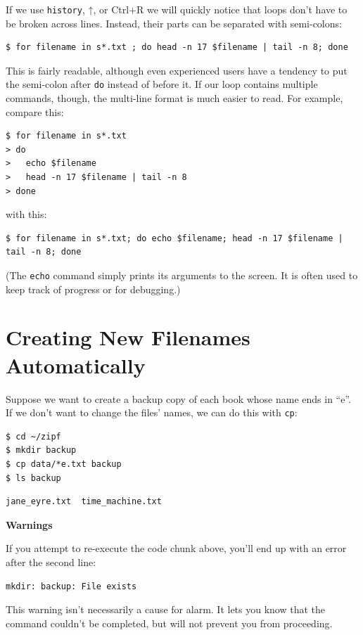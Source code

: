 \documentclass[
]{krantz}
\renewenvironment{quote}{\begin{VF}}{\end{VF}}
\begin{document}
If we use \texttt{history}, ↑, or Ctrl+R
we will quickly notice that loops don't have to be broken across lines.
Instead,
their parts can be separated with semi-colons:

\begin{verbatim}
$ for filename in s*.txt ; do head -n 17 $filename | tail -n 8; done
\end{verbatim}

This is fairly readable,
although even experienced users have a tendency to put the semi-colon after \texttt{do} instead of before it.
If our loop contains multiple commands,
though,
the multi-line format is much easier to read.
For example,
compare this:

\begin{verbatim}
$ for filename in s*.txt
> do
>   echo $filename
>   head -n 17 $filename | tail -n 8
> done
\end{verbatim}

with this:

\begin{verbatim}
$ for filename in s*.txt; do echo $filename; head -n 17 $filename | tail -n 8; done
\end{verbatim}

(The \texttt{echo} command simply prints its arguments to the screen.
It is often used to keep track of progress or for debugging.)

\hypertarget{bash-basics-autoname}{%
\section{Creating New Filenames Automatically}\label{bash-basics-autoname}}

Suppose we want to create a backup copy of each book whose name ends in ``e''.
If we don't want to change the files' names,
we can do this with \texttt{cp}:

\begin{verbatim}
$ cd ~/zipf
$ mkdir backup
$ cp data/*e.txt backup
$ ls backup
\end{verbatim}

\begin{verbatim}
jane_eyre.txt  time_machine.txt
\end{verbatim}

\begin{quote}
\textbf{Warnings}

If you attempt to re-execute the code chunk above,
you'll end up with an error after the second line:

\begin{verbatim}
mkdir: backup: File exists
\end{verbatim}

This warning isn't necessarily a cause for alarm.
It lets you know that the command couldn't be completed,
but will not prevent you from proceeding.
\end{quote}
\end{document}
